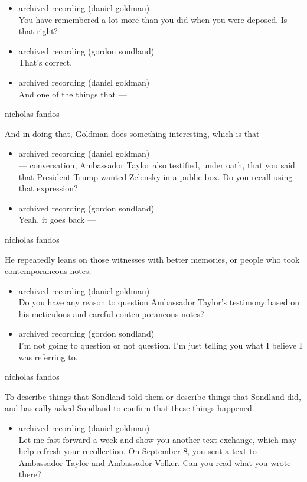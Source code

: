 \begin{itemize}
\item
  archived recording (daniel goldman)\\
  You have remembered a lot more than you did when you were deposed. Is
  that right?
\item
  archived recording (gordon sondland)\\
  That's correct.
\item
  archived recording (daniel goldman)\\
  And one of the things that ---
\end{itemize}

nicholas fandos

And in doing that, Goldman does something interesting, which is that ---

\begin{itemize}
\item
  archived recording (daniel goldman)\\
  --- conversation, Ambassador Taylor also testified, under oath, that
  you said that President Trump wanted Zelensky in a public box. Do you
  recall using that expression?
\item
  archived recording (gordon sondland)\\
  Yeah, it goes back ---
\end{itemize}

nicholas fandos

He repeatedly leans on those witnesses with better memories, or people
who took contemporaneous notes.

\begin{itemize}
\item
  archived recording (daniel goldman)\\
  Do you have any reason to question Ambassador Taylor's testimony based
  on his meticulous and careful contemporaneous notes?
\item
  archived recording (gordon sondland)\\
  I'm not going to question or not question. I'm just telling you what I
  believe I was referring to.
\end{itemize}

nicholas fandos

To describe things that Sondland told them or describe things that
Sondland did, and basically asked Sondland to confirm that these things
happened ---

\begin{itemize}
\tightlist
\item
  archived recording (daniel goldman)\\
  Let me fast forward a week and show you another text exchange, which
  may help refresh your recollection. On September 8, you sent a text to
  Ambassador Taylor and Ambassador Volker. Can you read what you wrote
  there?
\end{itemize}

